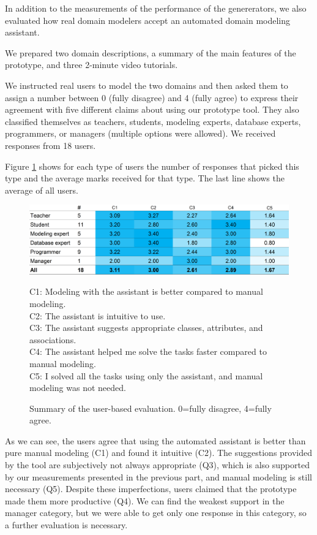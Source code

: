 In addition to the measurements of the performance of the genererators, we also evaluated how real domain modelers accept an automated domain modeling assistant.

We prepared two domain descriptions, a summary of the main features of the prototype, and three 2-minute video tutorials.

We instructed real users to model the two domains and then asked them to assign a number between 0 (fully disagree) and 4 (fully agree) to express their agreement with five different claims about using our prototype tool.
They also classified themselves as teachers, students, modeling experts, database experts, programmers, or managers (multiple options were allowed).
We received responses from 18 users.

Figure \ref{fig:user-based-evaluation} shows for each type of users the number of responses that picked this type and the average marks received for that type. The last line shows the average of all users.

\begin{figure}[!h]
    \includegraphics[width=1\linewidth]{img/user-based-evaluation.png} \\
    \scriptsize
\raggedright{C1: Modeling with the assistant is better compared to manual modeling. \\
C2: The assistant is intuitive to use.\\
C3: The assistant suggests appropriate classes, attributes, and associations.\\
C4: The assistant helped me solve the tasks faster compared to manual modeling.\\
C5: I solved all the tasks using only the assistant, and manual modeling was not needed.}
    \caption{Summary of the user-based evaluation. 0=fully disagree, 4=fully agree.}
    \label{fig:user-based-evaluation}
\end{figure}

As we can see, the users agree that using the automated assistant is better than pure manual modeling (C1) and found it intuitive (C2).
The suggestions provided by the tool are subjectively not always appropriate (Q3), which is also supported by our measurements presented in the previous part, and manual modeling is still necessary (Q5).
Despite these imperfections, users claimed that the prototype made them more productive (Q4).
We can find the weakest support in the manager category, but we were able to get only one response in this category, so a further evaluation is necessary.